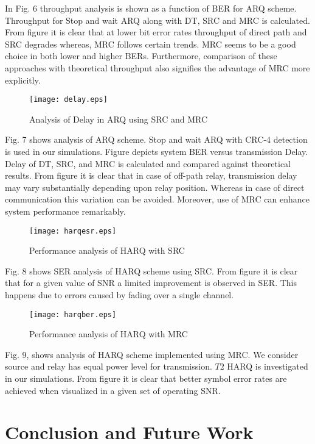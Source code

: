 \documentclass{sig-alternate}
\begin{document}
In Fig. 6 throughput analysis is shown as a function of BER for ARQ scheme. Throughput for Stop and wait ARQ along with DT, SRC and MRC is calculated. From figure it is clear that at lower bit error rates throughput of direct path and SRC degrades whereas, MRC follows certain trends. MRC seems to be a good choice in both lower and higher BERs. Furthermore, comparison of these approaches with theoretical throughput also signifies the advantage of MRC more explicitly.
\begin{figure}[!ht]
  \centering
  \texttt{[image: delay.eps]}
   \vspace{-.5cm}
  \caption{Analysis of Delay in ARQ using SRC and MRC}
\end{figure}
Fig. 7 shows analysis of ARQ scheme. Stop and wait ARQ with CRC-4 detection is used in our simulations. Figure depicts system BER versus transmission Delay. Delay of DT, SRC, and MRC is calculated and compared against theoretical results. From figure it is clear that in case of off-path relay, transmission delay may vary substantially depending upon relay position. Whereas in case of direct communication this variation can be avoided. Moreover, use of MRC can enhance system performance remarkably.

\begin{figure}[!ht]
  \centering
   \texttt{[image: harqesr.eps]}
     \vspace{-.5cm}
  \caption{Performance analysis of HARQ with SRC}
\end{figure}

Fig. 8 shows SER analysis of HARQ scheme using SRC. From figure it is clear that for a given value of SNR a limited improvement is observed  in SER. This happens due to errors caused by fading over a single channel.
\begin{figure}[!ht]
  \centering
  \texttt{[image: harqber.eps]}
   \vspace{-.5cm}
   \caption{Performance analysis of HARQ with MRC}
\end{figure}
Fig. 9, shows analysis of HARQ scheme implemented using MRC. We consider source and relay has equal power level for transmission. $T2$ HARQ is investigated in our simulations. From figure it is clear that better symbol error rates are achieved when visualized in a given set of operating SNR.

\section{Conclusion and Future Work}
\label{sec:majhead}
\end{document}
